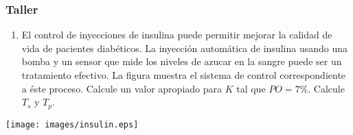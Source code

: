 \documentclass[aspectratio=169,handout]{beamer}
\theoremstyle{definition}
\theoremstyle{plain}
\theoremstyle{remark}
\newcounter{saveenumi}
\newcommand{\seti}{\setcounter{saveenumi}{\value{enumi}}}
\newcommand{\conti}{\setcounter{enumi}{\value{saveenumi}}}
\begin{document}
\begin{frame}[c]\frametitle{Taller}
\begin{enumerate}
  \conti
  \item El control de inyecciones de insulina puede permitir mejorar la calidad de vida de pacientes diabéticos. La inyección automática de insulina usando una bomba y un sensor que mide los niveles de azucar en la sangre puede ser un tratamiento efectivo. La figura muestra el sistema de control correspondiente a éste proceso. Calcule un valor apropiado para $K$ tal que $PO = 7\%$. Calcule $T_s$ y $T_p$.
  \seti
\end{enumerate}
\begin{center}
  \texttt{[image: images/insulin.eps]}
\end{center}
\end{frame}
\end{document}
